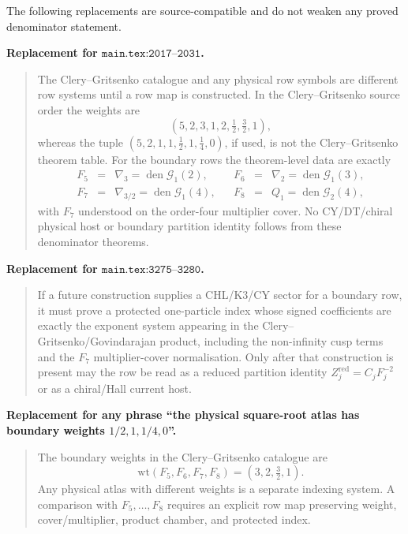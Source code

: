 \begin{proposition}
\label{prop:chl-boundary-replacement-text}
The following replacements are source-compatible and do not weaken any proved
denominator statement.

\smallskip
\noindent\textbf{Replacement for \(\texttt{main.tex:2017--2031}\).}
\begin{quote}
The Clery--Gritsenko catalogue and any physical row symbols are different
row systems until a row map is constructed.  In the Clery--Gritsenko source
order the weights are
\[
(5,2,3,1,2,\tfrac12,\tfrac32,1),
\]
whereas the tuple \((5,2,1,1,\tfrac12,1,\tfrac14,0)\), if used, is not the
Clery--Gritsenko theorem table.  For the boundary rows the theorem-level data
are exactly
\[
\begin{array}{rclcrcl}
F_5&=&\nabla_3=\operatorname{den}\mathcal G_1(2),
&&F_6&=&\nabla_2=\operatorname{den}\mathcal G_1(3),\\
F_7&=&\nabla_{3/2}=\operatorname{den}\mathcal G_1(4),
&&F_8&=&Q_1=\operatorname{den}\mathcal G_2(4),
\end{array}
\]
with \(F_7\) understood on the order-four multiplier cover.  No
CY/DT/chiral physical host or boundary partition identity follows
from these denominator theorems.
\end{quote}

\noindent\textbf{Replacement for \(\texttt{main.tex:3275--3280}\).}
\begin{quote}
If a future construction supplies a CHL/K3/CY sector for a boundary row, it
must prove a protected one-particle index whose signed coefficients are exactly
the exponent system appearing in the Clery--Gritsenko/Govindarajan product,
including the non-infinity cusp terms and the \(F_7\) multiplier-cover
normalisation.  Only after that construction is present may the row be read as
a reduced partition identity \(Z_j^{\mathrm{red}}=C_jF_j^{-2}\) or as a
chiral/Hall current host.
\end{quote}

\noindent\textbf{Replacement for any phrase ``the physical square-root atlas
has boundary weights \(1/2,1,1/4,0\)''.}
\begin{quote}
The boundary weights in the Clery--Gritsenko catalogue are
\[
\mathrm{wt}(F_5,F_6,F_7,F_8)=(3,2,\tfrac32,1).
\]
Any physical atlas with different weights is a separate indexing system.  A
comparison with \(F_5,\ldots,F_8\) requires an explicit row map preserving
weight, cover/multiplier, product chamber, and protected index.
\end{quote}
\end{proposition}


